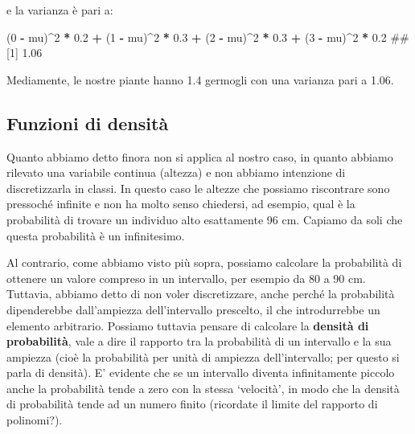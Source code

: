 \documentclass[a4paper,12pt,oneside]{book}
\newenvironment{Shaded}{\begin{snugshade}}{\end{snugshade}}
\newcommand{\DecValTok}[1]{\textcolor[rgb]{0.00,0.00,0.81}{#1}}
\newcommand{\FloatTok}[1]{\textcolor[rgb]{0.00,0.00,0.81}{#1}}
\newcommand{\StringTok}[1]{\textcolor[rgb]{0.31,0.60,0.02}{#1}}
\newcommand{\OperatorTok}[1]{\textcolor[rgb]{0.81,0.36,0.00}{\textbf{#1}}}
\newcommand{\NormalTok}[1]{#1}
\theoremstyle{definition}
\theoremstyle{definition}
\theoremstyle{definition}
\theoremstyle{remark}
\begin{document}
e la varianza è pari a:

\begin{Shaded}
\begin{Highlighting}[]
\NormalTok{(}\DecValTok{0} \OperatorTok{-}\StringTok{ }\NormalTok{mu)}\OperatorTok{^}\DecValTok{2} \OperatorTok{*}\StringTok{ }\FloatTok{0.2} \OperatorTok{+}\StringTok{ }\NormalTok{(}\DecValTok{1} \OperatorTok{-}\StringTok{ }\NormalTok{mu)}\OperatorTok{^}\DecValTok{2} \OperatorTok{*}\StringTok{ }\FloatTok{0.3} \OperatorTok{+}\StringTok{ }\NormalTok{(}\DecValTok{2} \OperatorTok{-}\StringTok{ }\NormalTok{mu)}\OperatorTok{^}\DecValTok{2} \OperatorTok{*}\StringTok{ }\FloatTok{0.3} \OperatorTok{+}
\StringTok{  }\NormalTok{(}\DecValTok{3} \OperatorTok{-}\StringTok{ }\NormalTok{mu)}\OperatorTok{^}\DecValTok{2} \OperatorTok{*}\StringTok{ }\FloatTok{0.2}
\NormalTok{## [1] 1.06}
\end{Highlighting}
\end{Shaded}

Mediamente, le nostre piante hanno 1.4 germogli con una varianza pari a
1.06.

\subsection{Funzioni di densità}\label{funzioni-di-densita}

Quanto abbiamo detto finora non si applica al nostro caso, in quanto
abbiamo rilevato una variabile continua (altezza) e non abbiamo
intenzione di discretizzarla in classi. In questo caso le altezze che
possiamo riscontrare sono pressoché infinite e non ha molto senso
chiedersi, ad esempio, qual è la probabilità di trovare un individuo
alto esattamente 96 cm. Capiamo da soli che questa probabilità è un
infinitesimo.

Al contrario, come abbiamo visto più sopra, possiamo calcolare la
probabilità di ottenere un valore compreso in un intervallo, per esempio
da 80 a 90 cm. Tuttavia, abbiamo detto di non voler discretizzare, anche
perché la probabilità dipenderebbe dall'ampiezza dell'intervallo
prescelto, il che introdurrebbe un elemento arbitrario. Possiamo
tuttavia pensare di calcolare la \textbf{densità di probabilità}, vale a
dire il rapporto tra la probabilità di un intervallo e la sua ampiezza
(cioè la probabilità per unità di ampiezza dell'intervallo; per questo
si parla di densità). E' evidente che se un intervallo diventa
infinitamente piccolo anche la probabilità tende a zero con la stessa
`velocità', in modo che la densità di probabilità tende ad un numero
finito (ricordate il limite del rapporto di polinomi?).
\end{document}
